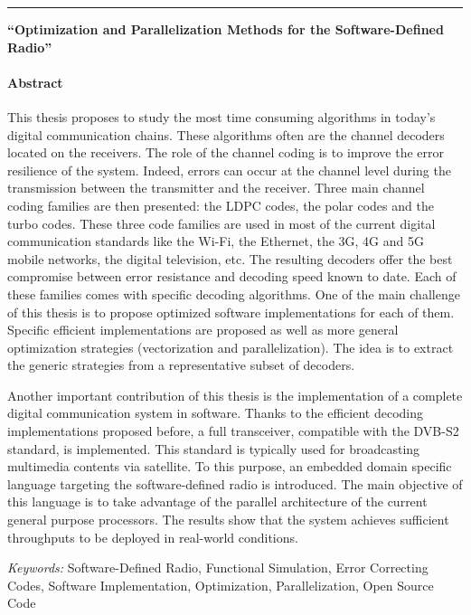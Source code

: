\documentclass[a4paper, 11pt]{article}
\begin{document}
\vskip0.5cm
{\color{bleuUni}\hrule}
\vskip0.5cm


\noindent
{\large \textbf{``Optimization and Parallelization Methods for the Software-Defined
                Radio''}}

\paragraph{Abstract}

This thesis proposes to study the most time consuming algorithms in today's
digital communication chains. These algorithms often are the channel decoders
located on the receivers. The role of the channel coding is to improve the error
resilience of the system. Indeed, errors can occur at the channel level during
the transmission between the transmitter and the receiver. Three main channel
coding families are then presented: the LDPC codes, the polar codes and the
turbo codes. These three code families are used in most of the current digital
communication standards like the Wi-Fi, the Ethernet, the 3G, 4G and 5G mobile
networks, the digital television, etc. The resulting decoders offer the best
compromise between error resistance and decoding speed known to date. Each of
these families comes with specific decoding algorithms. One of the main
challenge of this thesis is to propose optimized software implementations for
each of them. Specific efficient implementations are proposed as well as more
general optimization strategies (vectorization and parallelization). The idea is
to extract the generic strategies from a representative subset of decoders.

Another important contribution of this thesis is the implementation of a
complete digital communication system in software. Thanks to the efficient
decoding implementations proposed before, a full transceiver, compatible with
the DVB-S2 standard, is implemented. This standard is typically used for
broadcasting multimedia contents via satellite. To this purpose, an embedded
domain specific language targeting the software-defined radio is introduced. The
main objective of this language is to take advantage of the parallel
architecture of the current general purpose processors. The results show that
the system achieves sufficient throughputs to be deployed in real-world
conditions.

\vskip0.5cm
\emph{Keywords:} Software-Defined Radio, Functional Simulation, Error
                 Correcting Codes, Software Implementation, Optimization,
                 Parallelization, Open Source Code
\end{document}
